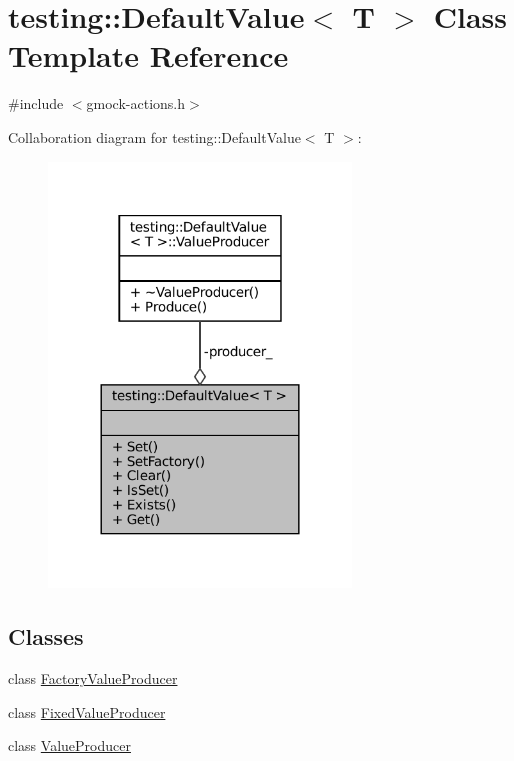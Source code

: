 \hypertarget{classtesting_1_1DefaultValue}{}\section{testing\+:\+:Default\+Value$<$ T $>$ Class Template Reference}
\label{classtesting_1_1DefaultValue}


{\ttfamily \#include $<$gmock-\/actions.\+h$>$}



Collaboration diagram for testing\+:\+:Default\+Value$<$ T $>$\+:
\nopagebreak
\begin{figure}[H]
\begin{center}
\leavevmode
\includegraphics[width=228pt]{classtesting_1_1DefaultValue__coll__graph}
\end{center}
\end{figure}
\subsection*{Classes}
\begin{DoxyCompactItemize}
\item 
class \hyperlink{classtesting_1_1DefaultValue_1_1FactoryValueProducer}{Factory\+Value\+Producer}
\item 
class \hyperlink{classtesting_1_1DefaultValue_1_1FixedValueProducer}{Fixed\+Value\+Producer}
\item 
class \hyperlink{classtesting_1_1DefaultValue_1_1ValueProducer}{Value\+Producer}
\end{DoxyCompactItemize}
